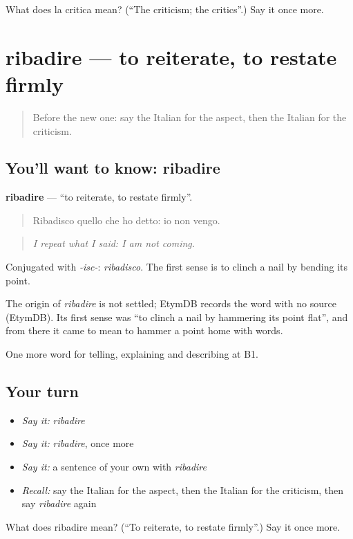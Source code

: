 \begin{tcolorbox}[breakable,colback=teal!4,colframe=teal!35!black,title={Before you move on}]
What does la critica mean? (\textquotedblleft{}The criticism; the critics\textquotedblright{}.) Say it once more.
\end{tcolorbox}
\section[ribadire]{ribadire — to reiterate, to restate firmly}

\label{lesson:IT-C348-ribadire}



\begin{quote}
Before the new one: say the Italian for the aspect, then the Italian for the criticism.
\end{quote}

\subsection*{You'll want to know: ribadire}
\textbf{ribadire} — \textquotedblleft{}to reiterate, to restate firmly\textquotedblright{}.

\begin{quote}
Ribadisco quello che ho detto: io non vengo.
\end{quote}

\begin{quote}
\emph{I repeat what I said: I am not coming.}
\end{quote}

Conjugated with \emph{-isc-}: \emph{ribadisco}. The first sense is to clinch a nail by bending its point.

\begin{cousinweb}
The origin of \emph{ribadire} is not settled; EtymDB records the word with no source (EtymDB). Its first sense was \textquotedblleft{}to clinch a nail by hammering its point flat\textquotedblright{}, and from there it came to mean to hammer a point home with words.
\end{cousinweb}

\begin{grammarlens}[title={What you've built}]
One more word for telling, explaining and describing at B1.
\end{grammarlens}

\subsection*{Your turn}
\begin{itemize}
\raggedright
  \item \emph{Say it:} \emph{ribadire}
  \item \emph{Say it:} \emph{ribadire}, once more
  \item \emph{Say it:} a sentence of your own with \emph{ribadire}
  \item \emph{Recall:} say the Italian for the aspect, then the Italian for the criticism, then say \emph{ribadire} again
\end{itemize}

\begin{tcolorbox}[breakable,colback=teal!4,colframe=teal!35!black,title={Before you move on}]
What does ribadire mean? (\textquotedblleft{}To reiterate, to restate firmly\textquotedblright{}.) Say it once more.
\end{tcolorbox}

